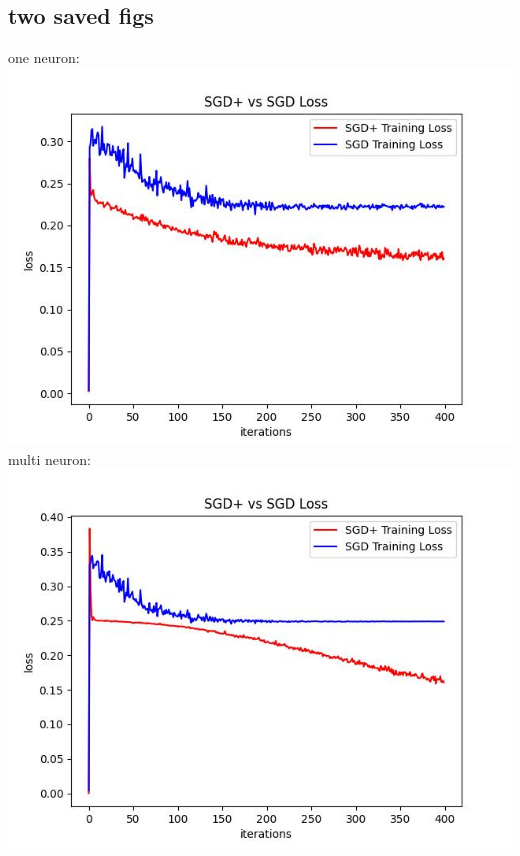 \documentclass{article}
\begin{document}
\subsection{two saved figs}
one neuron:\\
\includegraphics[scale=0.8]{one_neuron_loss.jpg}\\
multi neuron:\\
\includegraphics[scale=0.8]{multi_neuron_loss.jpg}
\end{document}
